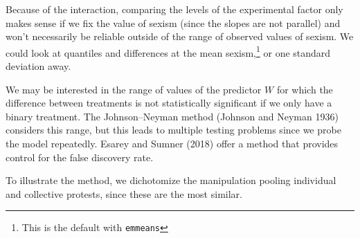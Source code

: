 \documentclass[
  11pt,
  letterpaper,
]{scrbook}
\newenvironment{Shaded}{\begin{snugshade}}{\end{snugshade}}
\newcommand{\AttributeTok}[1]{\textcolor[rgb]{0.40,0.45,0.13}{#1}}
\newcommand{\CommentTok}[1]{\textcolor[rgb]{0.37,0.37,0.37}{#1}}
\newcommand{\ConstantTok}[1]{\textcolor[rgb]{0.56,0.35,0.01}{#1}}
\newcommand{\FunctionTok}[1]{\textcolor[rgb]{0.28,0.35,0.67}{#1}}
\newcommand{\NormalTok}[1]{\textcolor[rgb]{0.00,0.23,0.31}{#1}}
\newcommand{\OtherTok}[1]{\textcolor[rgb]{0.00,0.23,0.31}{#1}}
\newcommand{\SpecialCharTok}[1]{\textcolor[rgb]{0.37,0.37,0.37}{#1}}
\newcommand{\StringTok}[1]{\textcolor[rgb]{0.13,0.47,0.30}{#1}}
\theoremstyle{definition}
\theoremstyle{remark}
\begin{document}
Because of the interaction, comparing the levels of the experimental
factor only makes sense if we fix the value of sexism (since the slopes
are not parallel) and won't necessarily be reliable outside of the range
of observed values of sexism. We could look at quantiles and differences
at the mean sexism,\footnote{This is the default with \texttt{emmeans}}
or one standard deviation away.

We may be interested in the range of values of the predictor \(W\) for
which the difference between treatments is not statistically significant
if we only have a binary treatment. The Johnson--Neyman method (Johnson
and Neyman 1936) considers this range, but this leads to multiple
testing problems since we probe the model repeatedly. Esarey and Sumner
(2018) offer a method that provides control for the false discovery
rate.

To illustrate the method, we dichotomize the manipulation pooling
individual and collective protests, since these are the most similar.

\begin{Shaded}
\end{Shaded}
\end{document}
